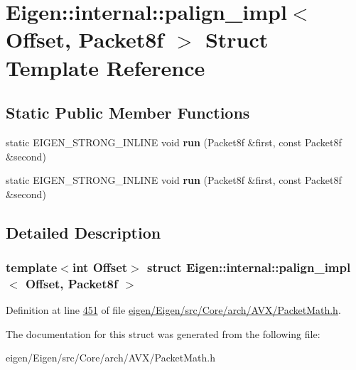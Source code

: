 \hypertarget{struct_eigen_1_1internal_1_1palign__impl_3_01_offset_00_01_packet8f_01_4}{}\section{Eigen\+:\+:internal\+:\+:palign\+\_\+impl$<$ Offset, Packet8f $>$ Struct Template Reference}
\label{struct_eigen_1_1internal_1_1palign__impl_3_01_offset_00_01_packet8f_01_4}
\subsection*{Static Public Member Functions}
\begin{DoxyCompactItemize}
\item 
\mbox{\label{struct_eigen_1_1internal_1_1palign__impl_3_01_offset_00_01_packet8f_01_4_ab88632af1fe3faa1252771cf2d3fe770}} 
static E\+I\+G\+E\+N\+\_\+\+S\+T\+R\+O\+N\+G\+\_\+\+I\+N\+L\+I\+NE void {\bfseries run} (Packet8f \&first, const Packet8f \&second)
\item 
\mbox{\label{struct_eigen_1_1internal_1_1palign__impl_3_01_offset_00_01_packet8f_01_4_ab88632af1fe3faa1252771cf2d3fe770}} 
static E\+I\+G\+E\+N\+\_\+\+S\+T\+R\+O\+N\+G\+\_\+\+I\+N\+L\+I\+NE void {\bfseries run} (Packet8f \&first, const Packet8f \&second)
\end{DoxyCompactItemize}


\subsection{Detailed Description}
\subsubsection*{template$<$int Offset$>$\newline
struct Eigen\+::internal\+::palign\+\_\+impl$<$ Offset, Packet8f $>$}



Definition at line \hyperlink{eigen_2_eigen_2src_2_core_2arch_2_a_v_x_2_packet_math_8h_source_l00451}{451} of file \hyperlink{eigen_2_eigen_2src_2_core_2arch_2_a_v_x_2_packet_math_8h_source}{eigen/\+Eigen/src/\+Core/arch/\+A\+V\+X/\+Packet\+Math.\+h}.



The documentation for this struct was generated from the following file\+:\begin{DoxyCompactItemize}
\item 
eigen/\+Eigen/src/\+Core/arch/\+A\+V\+X/\+Packet\+Math.\+h\end{DoxyCompactItemize}
